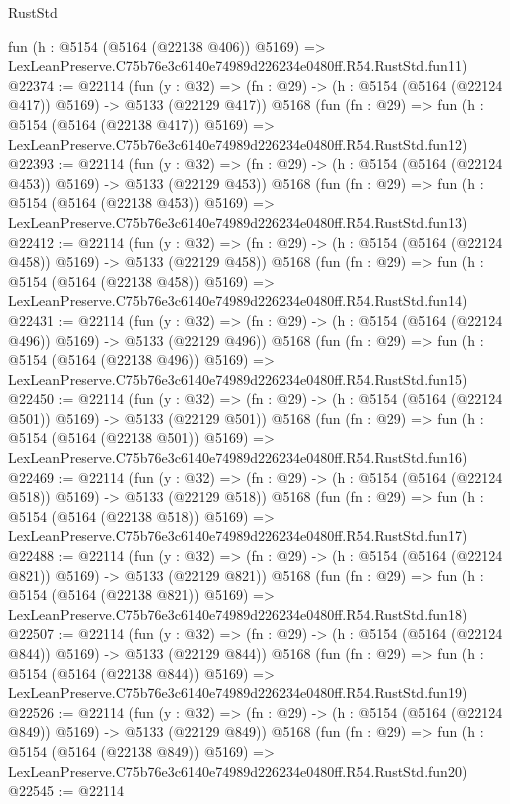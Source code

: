 \begin{lexlean}{RustStd}
\begin{coremodule}
    fun (h : @5154 (@5164 (@22138 @406)) @5169) =>
    LexLeanPreserve.C75b76e3c6140e74989d226234e0480ff.R54.RustStd.fun11)
@22374 := @22114
    (fun (y : @32) => (fn : @29) -> (h : @5154 (@5164 (@22124 @417)) @5169) -> @5133 (@22129 @417))
    @5168
    (fun (fn : @29) =>
    fun (h : @5154 (@5164 (@22138 @417)) @5169) =>
    LexLeanPreserve.C75b76e3c6140e74989d226234e0480ff.R54.RustStd.fun12)
@22393 := @22114
    (fun (y : @32) => (fn : @29) -> (h : @5154 (@5164 (@22124 @453)) @5169) -> @5133 (@22129 @453))
    @5168
    (fun (fn : @29) =>
    fun (h : @5154 (@5164 (@22138 @453)) @5169) =>
    LexLeanPreserve.C75b76e3c6140e74989d226234e0480ff.R54.RustStd.fun13)
@22412 := @22114
    (fun (y : @32) => (fn : @29) -> (h : @5154 (@5164 (@22124 @458)) @5169) -> @5133 (@22129 @458))
    @5168
    (fun (fn : @29) =>
    fun (h : @5154 (@5164 (@22138 @458)) @5169) =>
    LexLeanPreserve.C75b76e3c6140e74989d226234e0480ff.R54.RustStd.fun14)
@22431 := @22114
    (fun (y : @32) => (fn : @29) -> (h : @5154 (@5164 (@22124 @496)) @5169) -> @5133 (@22129 @496))
    @5168
    (fun (fn : @29) =>
    fun (h : @5154 (@5164 (@22138 @496)) @5169) =>
    LexLeanPreserve.C75b76e3c6140e74989d226234e0480ff.R54.RustStd.fun15)
@22450 := @22114
    (fun (y : @32) => (fn : @29) -> (h : @5154 (@5164 (@22124 @501)) @5169) -> @5133 (@22129 @501))
    @5168
    (fun (fn : @29) =>
    fun (h : @5154 (@5164 (@22138 @501)) @5169) =>
    LexLeanPreserve.C75b76e3c6140e74989d226234e0480ff.R54.RustStd.fun16)
@22469 := @22114
    (fun (y : @32) => (fn : @29) -> (h : @5154 (@5164 (@22124 @518)) @5169) -> @5133 (@22129 @518))
    @5168
    (fun (fn : @29) =>
    fun (h : @5154 (@5164 (@22138 @518)) @5169) =>
    LexLeanPreserve.C75b76e3c6140e74989d226234e0480ff.R54.RustStd.fun17)
@22488 := @22114
    (fun (y : @32) => (fn : @29) -> (h : @5154 (@5164 (@22124 @821)) @5169) -> @5133 (@22129 @821))
    @5168
    (fun (fn : @29) =>
    fun (h : @5154 (@5164 (@22138 @821)) @5169) =>
    LexLeanPreserve.C75b76e3c6140e74989d226234e0480ff.R54.RustStd.fun18)
@22507 := @22114
    (fun (y : @32) => (fn : @29) -> (h : @5154 (@5164 (@22124 @844)) @5169) -> @5133 (@22129 @844))
    @5168
    (fun (fn : @29) =>
    fun (h : @5154 (@5164 (@22138 @844)) @5169) =>
    LexLeanPreserve.C75b76e3c6140e74989d226234e0480ff.R54.RustStd.fun19)
@22526 := @22114
    (fun (y : @32) => (fn : @29) -> (h : @5154 (@5164 (@22124 @849)) @5169) -> @5133 (@22129 @849))
    @5168
    (fun (fn : @29) =>
    fun (h : @5154 (@5164 (@22138 @849)) @5169) =>
    LexLeanPreserve.C75b76e3c6140e74989d226234e0480ff.R54.RustStd.fun20)
@22545 := @22114

\end{coremodule}
\end{lexlean}
